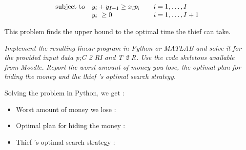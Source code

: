 \documentclass[10pt]{article}
\newenvironment{exercise}[2][Exercise]{\begin{trivlist}
  \item[\hskip \labelsep {\bfseries #1}\hskip \labelsep {\bfseries #2.}]}{\end{trivlist}}
\begin{document}
\begin{exercise}{5}
\begin{equation}
\begin{array}{ll@{}lll}
\text{subject to} 
&& y_i + y_{I+1} \geq x_i p_i  &&  i=1 ,\dots, I\\
&& y_i\ \geq 0 && i=1 ,\dots, I+1\\ 

\end{array}
\end{equation}

This problem finds the upper bound to the optimal time the thief can take.


\textit{Implement the resulting linear program in Python or MATLAB and solve it for the provided input data p;C 2 RI and T 2 R. Use the code skeletons available from Moodle. Report the worst amount of money you lose, the optimal plan for hiding the money and the thief 's optimal search strategy.}

Solving the problem in Python, we get :
\begin{itemize}
    \item   Worst amount of money we lose : 
    \item Optimal plan for hiding the money : 
    \item  Thief 's optimal search strategy : 
\end{itemize}

\end{exercise}

  
\end{document}
